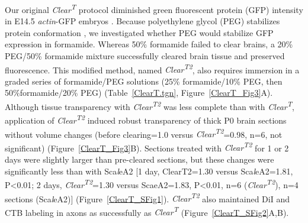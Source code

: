 Our original \emph{Clear\textsuperscript{T}} protocol diminished green fluorescent protein (GFP) intensity in E14.5 \emph{actin}-GFP embryos \cite{ikawa1995rapid}.
Because polyethylene glycol (PEG) stabilizes protein conformation \cite{rawat2010molecular}, we investigated whether PEG would stabilize GFP expression in formamide.
Whereas 50\% formamide failed to clear brains, a 20\% PEG/50\% formamide mixture successfully cleared brain tissue and preserved fluorescence.
This modified method, named \emph{Clear\textsuperscript{T2}}, also requires immersion in a graded series of formamide/PEG solutions (25\% formamide/10\% PEG, then 50\%formamide/20\% PEG) (Table~\ref{ClearT.tgn}, Figure~\ref{ClearT_Fig3}A).
Although tissue transparency with \emph{Clear\textsuperscript{T2}} was less complete than with \emph{Clear\textsuperscript{T}}, application of \emph{Clear\textsuperscript{T2}} induced robust transparency of thick P0 brain sections without volume changes (before clearing=1.0 versus \emph{Clear\textsuperscript{T2}}=0.98, n=6, not significant) (Figure~\ref{ClearT_Fig3}B).
Sections treated with \emph{Clear\textsuperscript{T2}} for 1 or 2 days were slightly larger than pre-cleared sections, but these changes were significantly less than with Sca\emph{l}eA2 [1 day, ClearT2=1.30 versus Sca\emph{l}eA2=1.81, P<0.01; 2 days, \emph{Clear\textsuperscript{T2}}=1.30 versus ScaeA2=1.83, P<0.01, n=6 (\emph{Clear\textsuperscript{T2}}), n=4 sections (Sca\emph{l}eA2)] (Figure~\ref{ClearT_SFig1}).
\emph{Clear\textsuperscript{T2}} also maintained DiI and CTB labeling in axons as successfully as \emph{Clear\textsuperscript{T}} (Figure~\ref{ClearT_SFig2}A,B).
